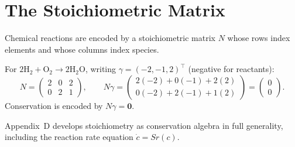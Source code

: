 \documentclass[11pt, openany]{book}
\theoremstyle{plain}
\theoremstyle{definition}
\theoremstyle{remark}
\begin{document}
\begin{center}
\end{center}

\section{The Stoichiometric Matrix}

Chemical reactions are encoded by a stoichiometric matrix $N$ whose rows
index elements and whose columns index species.

\begin{myexample}
For $2\mathrm{H_2}+\mathrm{O_2}\to2\mathrm{H_2O}$, writing
$\gamma=(-2,-1,2)^\top$ (negative for reactants):
\[
  N=\begin{pmatrix}2&0&2\\0&2&1\end{pmatrix},\qquad
  N\gamma=\begin{pmatrix}2(-2)+0(-1)+2(2)\\0(-2)+2(-1)+1(2)\end{pmatrix}
  =\begin{pmatrix}0\\0\end{pmatrix}.
\]
Conservation is encoded by $N\gamma=\mathbf{0}$.
\end{myexample}

\begin{deepnote}
Appendix~D develops stoichiometry as conservation algebra in full generality,
including the reaction rate equation $\dot{c}=Sr(c)$.
\end{deepnote}
\end{document}
